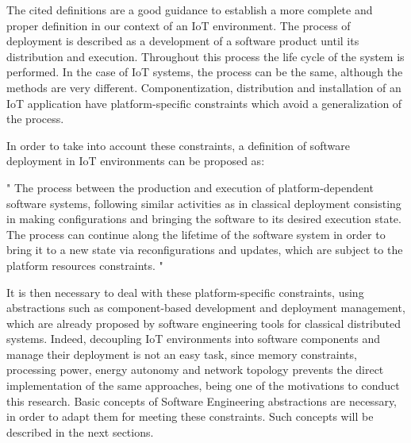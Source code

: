 The cited definitions are a good guidance to establish a more complete and proper definition in our context of an IoT environment.
The process of deployment is described as a development of a software product until its distribution and execution.
Throughout this process the life cycle of the system is performed.
In the case of IoT systems, the process can be the same, although the methods are very different.
Componentization, distribution and installation of an IoT application have platform-specific constraints which avoid a generalization of the process.

In order to take into account these constraints, a definition of software deployment in IoT environments can be proposed as:
\begin{citeverbatim}
	" The process between the production and execution of platform-dependent software systems, following similar activities as in classical deployment consisting in making configurations and bringing the software to its desired execution state. The process can continue along the lifetime of the software system in order to bring it to a new state via reconfigurations and updates, which are subject to the platform resources constraints. "
\end{citeverbatim}
It is then necessary to deal with these platform-specific constraints, using abstractions such as component-based development and deployment management, which are already proposed by software engineering tools for classical distributed systems.
Indeed, decoupling IoT environments into software components and manage their deployment is not an easy task, since memory constraints, processing power, energy autonomy and network topology prevents the direct implementation of the same approaches, being one of the motivations to conduct this research.
Basic concepts of Software Engineering abstractions are necessary, in order to adapt them for meeting these constraints.
Such concepts will be described in the next sections.

